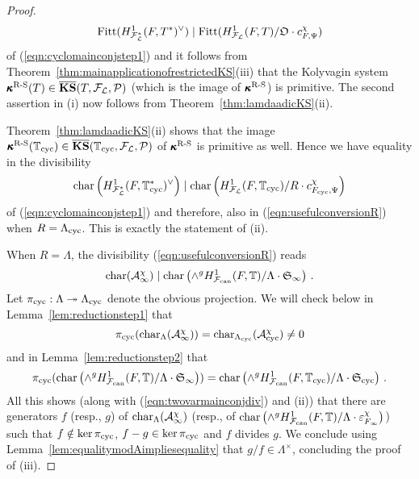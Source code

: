 \documentclass[12pt]{amsart}
\numberwithin{equation}{section}
\begin{document}
\begin{proof}
$$\textup{Fitt}(H^1_{{\mathcal{F}}_{\mathcal{L}}^*}(F,T^*)^\vee)\mid \textup{Fitt}(H^1_{{\mathcal{F}}_{\mathcal{L}}}(F,T)/{\frak{O}}\cdot c_{F,\Psi}^\chi)$$
of (\ref{eqn:cyclomainconjstep1}) and it follows from Theorem~\ref{thm:mainapplicationofrestrictedKS}(iii) that the Kolyvagin system $\pmb{\kappa}^{\textup{R-S}}(T) \in \overline{\textbf{\textup{KS}}}(T,{\mathcal{F}}_{\mathcal{L}},{\mathcal{P}})$ (which is the image of $\pmb{\kappa}^{\textup{R-S}}$) is primitive. The second assertion in (i) now follows from Theorem~\ref{thm:lamdaadicKS}(ii).

Theorem~\ref{thm:lamdaadicKS}(ii) shows that the image $\pmb{\kappa}^{\textup{R-S}}({\mathbb{T}}_{\textup{cyc}}) \in \overline{\textbf{\textup{KS}}}({\mathbb{T}}_{\textup{cyc}},{\mathcal{F}}_{\mathcal{L}},{\mathcal{P}})$ of $\pmb{\kappa}^{\textup{R-S}}$ is primitive as well. Hence we have equality in the divisibility
$$\textup{char}\left(H^1_{{\mathcal{F}}_{\mathcal{L}}^*}(F,{\mathbb{T}}_{\textup{cyc}}^*)^\vee\right)\mid \textup{char}\left(H^1_{{\mathcal{F}}_{\mathcal{L}}}(F,{\mathbb{T}}_{\textup{cyc}})/R\cdot c_{F_{\textup{cyc}},\Psi}^\chi\right)$$
of (\ref{eqn:cyclomainconjstep1}) and therefore, also in (\ref{eqn:usefulconversionR}) when $R={\Lambda}_{\textup{cyc}}$. This is exactly the statement of (ii). 

When $R={\Lambda}$, the divisibility (\ref{eqn:usefulconversionR}) reads 
\begin{equation}\label{eqn:twovarmainconjdiv}{\textup{char}}(\mathcal{A}_\infty^\chi)\mid {\textup{char}}\left(\wedge^g H^1_{\mathcal{F}_{\textup{\lowercase{can}}}}(F,{\mathbb{T}})/{\Lambda}\cdot\frak{S}_\infty\right)\,.\end{equation}
Let $\pi_{\textup{cyc}}:{\Lambda}\twoheadrightarrow{\Lambda}_{\textup{cyc}}$ denote the obvious projection. We will check below in Lemma~\ref{lem:reductionstep1} that 
$$\pi_{\textup{cyc}}({\textup{char}}_{\Lambda}(\mathcal{A}_\infty^\chi))={\textup{char}}_{{\Lambda}_{\textup{cyc}}}(\mathcal{A}_{\textup{cyc}}^\chi) \neq 0$$ and in Lemma~\ref{lem:reductionstep2} that 
$$\pi_{\textup{cyc}}({\textup{char}}\left(\wedge^g H^1_{\mathcal{F}_{\textup{\lowercase{can}}}}(F,{\mathbb{T}})/{\Lambda}\cdot\frak{S}_\infty\right))={\textup{char}}\left(\wedge^g H^1_{\mathcal{F}_{\textup{\lowercase{can}}}}(F,{\mathbb{T}}_{\textup{cyc}})/{\Lambda}\cdot\frak{S}_{\textup{cyc}}\right)\,.$$
All this shows (along with (\ref{eqn:twovarmainconjdiv}) and (ii)) that there are generators $f$ (resp., $g$) of ${\textup{char}}_{\Lambda}(\mathcal{A}_\infty^\chi)$ (resp., of ${\textup{char}}\left(\wedge^g H^1_{\mathcal{F}_{\textup{\lowercase{can}}}}(F,{\mathbb{T}})/{\Lambda}\cdot\varepsilon_{F_\infty}^\chi\right)$) such that  $f \notin \ker\pi_{\textup{cyc}}$, $f-g \in \ker\pi_{\textup{cyc}}$ and $f$ divides $g$. We conclude using Lemma~\ref{lem:equalitymodAimpliesequality} that $g/f \in {\Lambda}^\times$, concluding the proof of (iii).
\end{proof}
\end{document}
